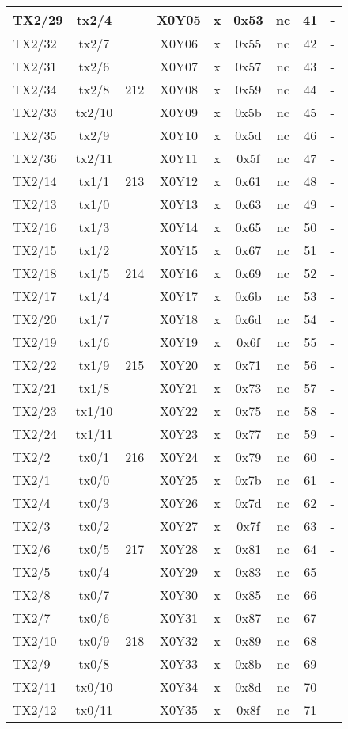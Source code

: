 \begin{longtable}{|l|c|c|c|c|c|c|c|l|}
TX2/29 & tx2/4  &     & X0Y05 &  x  & 0x53 & nc & 41 & -\\\hline
TX2/32 & tx2/7  &     & X0Y06 &  x  & 0x55 & nc & 42 & -\\\hline
TX2/31 & tx2/6  &     & X0Y07 &  x  & 0x57 & nc & 43 & -\\\hline
TX2/34 & tx2/8  & 212 & X0Y08 &  x  & 0x59 & nc & 44 & -\\\hline
TX2/33 & tx2/10 &     & X0Y09 &  x  & 0x5b & nc & 45 & -\\\hline
TX2/35 & tx2/9  &     & X0Y10 &  x  & 0x5d & nc & 46 & -\\\hline
TX2/36 & tx2/11 &     & X0Y11 &  x  & 0x5f & nc & 47 & -\\\hline
TX2/14 & tx1/1  & 213 & X0Y12 &  x  & 0x61 & nc & 48 & -\\\hline
TX2/13 & tx1/0  &     & X0Y13 &  x  & 0x63 & nc & 49 & -\\\hline
TX2/16 & tx1/3  &     & X0Y14 &  x  & 0x65 & nc & 50 & -\\\hline
TX2/15 & tx1/2  &     & X0Y15 &  x  & 0x67 & nc & 51 & -\\\hline
TX2/18 & tx1/5  & 214 & X0Y16 &  x  & 0x69 & nc & 52 & -\\\hline
TX2/17 & tx1/4  &     & X0Y17 &  x  & 0x6b & nc & 53 & -\\\hline
TX2/20 & tx1/7  &     & X0Y18 &  x  & 0x6d & nc & 54 & -\\\hline
TX2/19 & tx1/6  &     & X0Y19 &  x  & 0x6f & nc & 55 & -\\\hline
TX2/22 & tx1/9  & 215 & X0Y20 &  x  & 0x71 & nc & 56 & -\\\hline
TX2/21 & tx1/8  &     & X0Y21 &  x  & 0x73 & nc & 57 & -\\\hline
TX2/23 & tx1/10 &     & X0Y22 &  x  & 0x75 & nc & 58 & -\\\hline
TX2/24 & tx1/11 &     & X0Y23 &  x  & 0x77 & nc & 59 & -\\\hline
TX2/2  & tx0/1  & 216 & X0Y24 &  x  & 0x79 & nc & 60 & -\\\hline
TX2/1  & tx0/0  &     & X0Y25 &  x  & 0x7b & nc & 61 & -\\\hline
TX2/4  & tx0/3  &     & X0Y26 &  x  & 0x7d & nc & 62 & -\\\hline
TX2/3  & tx0/2  &     & X0Y27 &  x  & 0x7f & nc & 63 & -\\\hline
TX2/6  & tx0/5  & 217 & X0Y28 &  x  & 0x81 & nc & 64 & -\\\hline
TX2/5  & tx0/4  &     & X0Y29 &  x  & 0x83 & nc & 65 & -\\\hline
TX2/8  & tx0/7  &     & X0Y30 &  x  & 0x85 & nc & 66 & -\\\hline
TX2/7  & tx0/6  &     & X0Y31 &  x  & 0x87 & nc & 67 & -\\\hline
TX2/10 & tx0/9  & 218 & X0Y32 &  x  & 0x89 & nc & 68 & -\\\hline
TX2/9  & tx0/8  &     & X0Y33 &  x  & 0x8b & nc & 69 & -\\\hline
TX2/11 & tx0/10 &     & X0Y34 &  x  & 0x8d & nc & 70 & -\\\hline
TX2/12 & tx0/11 &     & X0Y35 &  x  & 0x8f & nc & 71 & -\\\hline
\end{longtable}

